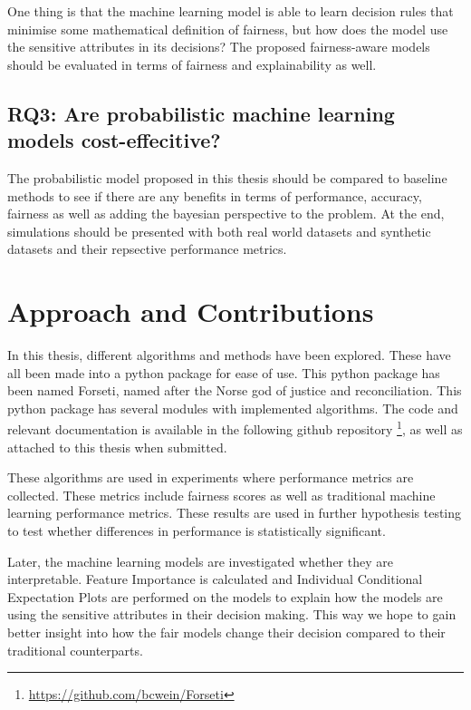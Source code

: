 One thing is that the machine learning model is able to learn decision rules that minimise some mathematical definition of fairness, but how does the model use the sensitive attributes in its decisions? The proposed fairness-aware models should be evaluated in terms of fairness and explainability as well. 

\subsection{RQ3: Are probabilistic machine learning models cost-effecitive?}

The probabilistic model proposed in this thesis should be compared to baseline methods to see if there are any benefits in terms of performance, accuracy, fairness as well as adding the bayesian perspective to the problem. At the end, simulations should be presented with both real world datasets and synthetic datasets and their repsective performance metrics.

\section{Approach and Contributions}
\label{sec:intro:approach}

In this thesis, different algorithms and methods have been explored. These have all been made into a python package for ease of use. This python package has been named Forseti, named after the Norse god of justice and reconciliation. This python package has several modules with implemented algorithms. The code and relevant documentation is available in the following github repository \footnote{\url{https://github.com/bcwein/Forseti}}, as well as attached to this thesis when submitted.

These algorithms are used in experiments where performance metrics are collected. These metrics include fairness scores as well as traditional machine learning performance metrics. These results are used in further hypothesis testing to test whether differences in performance is statistically significant.

Later, the machine learning models are investigated whether they are interpretable. Feature Importance is calculated and Individual Conditional Expectation Plots are performed on the models to explain how the models are using the sensitive attributes in their decision making. This way we hope to gain better insight into how the fair models change their decision compared to their traditional counterparts.

